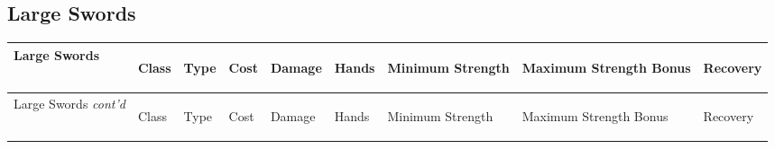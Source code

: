 \documentclass[twoside]{book}
\begin{document}
    

\subsection{Large Swords}
    
\begin{longtable}{p{1.25in}llllp{2em}p{3em}p{3em}l} 
  Large Swords& \begin{turn}{70}{Class}\end{turn}
          & \begin{turn}{70}{Type}\end{turn}
          & \begin{turn}{70}{Cost}\end{turn}
          & \begin{turn}{70}{Damage}\end{turn}
          & \begin{turn}{70}{Hands}\end{turn}
          & \begin{turn}{70}{Minimum Strength}\end{turn}
          & \begin{turn}{70}{Maximum Strength Bonus}\end{turn}
          & \begin{turn}{70}{Recovery}\end{turn}
          \\
  \hline
  \hline
  \endfirsthead
  Large Swords \textit{cont'd}
        & \begin{turn}{70}{Class}\end{turn}
          & \begin{turn}{70}{Type}\end{turn}
          & \begin{turn}{70}{Cost}\end{turn}
          & \begin{turn}{70}{Damage}\end{turn}
          & \begin{turn}{70}{Hands}\end{turn}
          & \begin{turn}{70}{Minimum Strength}\end{turn}
          & \begin{turn}{70}{Maximum Strength Bonus}\end{turn}
          & \begin{turn}{70}{Recovery}\end{turn}
           \\

\end{longtable}
\end{document}
